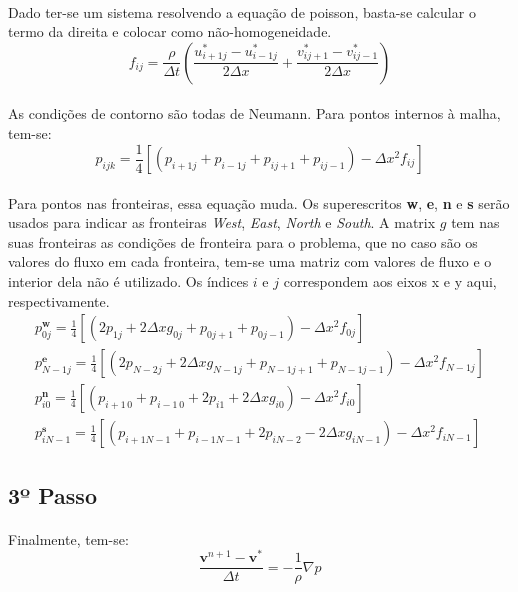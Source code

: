 \documentclass[a4paper,11pt]{article}
\begin{document}
\paragraph{} Dado ter-se um sistema resolvendo a equação de poisson, basta-se calcular o termo da direita e colocar como não-homogeneidade.
\begin{equation}
f_{ij}=\frac{\rho}{\Delta t}\left( \frac{u_{i+1j}^*-u_{i-1j}^*}{2\Delta x}+\frac{v_{ij+1}^*-v_{ij-1}^*}{2\Delta x}\right)
\end{equation}
\paragraph{} As condições de contorno são todas de Neumann. Para pontos internos à malha, tem-se:
\begin{equation}
p_{ijk}=\frac{1}{4}[(p_{i+1j}+p_{i-1j}+p_{ij+1}+p_{ij-1})-\Delta x^2 f_{ij}]
\end{equation}
\paragraph{} Para pontos nas fronteiras, essa equação muda. Os superescritos \textbf{w}, \textbf{e}, \textbf{n} e \textbf{s} serão usados para indicar as fronteiras \textit{West}, \textit{East}, \textit{North} e \textit{South}. A matrix $g$ tem nas suas fronteiras as condições de fronteira para o problema, que no caso são os valores do fluxo em cada fronteira, tem-se uma matriz com valores de fluxo e o interior dela não é utilizado. Os índices $i$ e $j$ correspondem aos eixos x e y aqui, respectivamente.
\begin{eqnarray}
p_{0j}^{\textbf{w}}=\frac{1}{4}[(2p_{1j}+2\Delta x g_{0j}+p_{0j+1}+p_{0j-1})-\Delta x^2 f_{0j}]\\
p_{N-1j}^{\textbf{e}}=\frac{1}{4}[(2p_{N-2j}+2\Delta x g_{N-1j}+p_{N-1j+1}+p_{N-1j-1})-\Delta x^2 f_{N-1j}]\\
p_{i0}^{\textbf{n}}=\frac{1}{4}[(p_{i+1\,0}+p_{i-1\,0}+2p_{i1}+2\Delta x g_{i0})-\Delta x^2 f_{i0}]\\
p_{iN-1}^{\textbf{s}}=\frac{1}{4}[(p_{i+1N-1}+p_{i-1N-1}+2p_{iN-2}-2\Delta x g_{iN-1})-\Delta x^2 f_{iN-1}]
\end{eqnarray}
\subsection{3º Passo}
\paragraph{} Finalmente, tem-se:
\begin{equation}
\frac{\textbf{v}^{n+1}-\textbf{v}^*}{\Delta t}=-\frac{1}{\rho}\nabla p
\end{equation}
\end{document}
